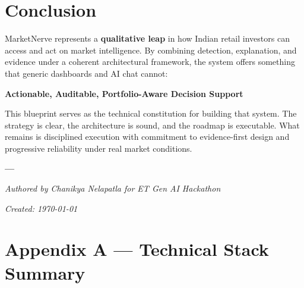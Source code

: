 \documentclass[11pt,a4paper]{article}
\begin{document}
\section{Conclusion}

MarketNerve represents a \textbf{qualitative leap} in how Indian retail investors can access and act on market intelligence. By combining detection, explanation, and evidence under a coherent architectural framework, the system offers something that generic dashboards and AI chat cannot:

\begin{tcolorbox}[colback=mn-navy!5, colframe=mn-navy, arc=2mm, boxsep=12pt]
\centering
\textbf{\Large \color{mn-navy}Actionable, Auditable, Portfolio-Aware Decision Support}
\end{tcolorbox}

\vspace{0.8cm}

This blueprint serves as the technical constitution for building that system. The strategy is clear, the architecture is sound, and the roadmap is executable. What remains is disciplined execution with commitment to evidence-first design and progressive reliability under real market conditions.

\vspace{1.5cm}

\begin{center}
\textbf{\Large \color{mn-navy}---}

\vspace{0.8cm}

\textit{Authored by Chanikya Nelapatla for ET Gen AI Hackathon}

\textit{Created: \today}

\end{center}

\newpage
\appendix

\section{Appendix A — Technical Stack Summary}
\end{document}
